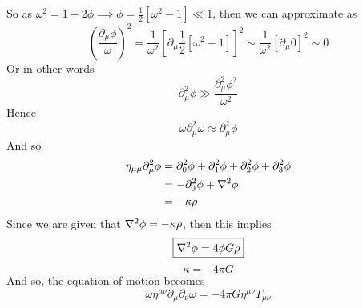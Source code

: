 \documentclass{article}
\begin{document}
	So as $\omega^2 = 1+2\phi \implies \phi = \frac12 \left[ \omega^2 - 1\right] \ll 1$, then we can approximate as
	$$  \left( \frac{\partial_\mu \phi}{\omega}\right)^2 = \frac{1}{\omega^2} \left[ \partial_\mu \frac12 \left[ \omega^2 -1\right]\right]^2 \sim \frac{1}{\omega^2} \left[ \partial_\mu 0\right]^2 \sim 0$$
	Or in other words 
	$$ \partial_\mu^2 \phi \gg \frac{\partial_\mu^2 \phi^2}{\omega^2}$$
	Hence $$ \omega \partial_\mu^2 \omega \approx \partial_\mu^2 \phi $$
	And so
	\begin{align*}
		\eta_{\mu\mu} \partial_\mu^2 \phi &= \partial_0^2 \phi + \partial_1^2 \phi + \partial_2^2 \phi + \partial_3^2 \phi \\
		&= -\partial_0^2 \phi + \nabla^2 \phi \\
		&= - \kappa \rho
	\end{align*}
	Since we are given that $\nabla^2 \phi = - \kappa \rho$, then this implies
	\begin{equation}
		\boxed{\nabla^2 \phi = 4 \phi G \rho}
	\end{equation}
	\begin{equation}
		\boxed{\kappa = -4\pi G}
	\end{equation}
	And so, the equation of motion becomes
	\begin{equation}
		\label{ans:2.1}
		\boxed{\omega \eta^{\mu\nu} \partial_\mu \partial_\nu \omega = - 4 \pi G \eta^{\mu\nu} T_{\mu\nu}}
	\end{equation}
	\pagebreak
\end{document}
